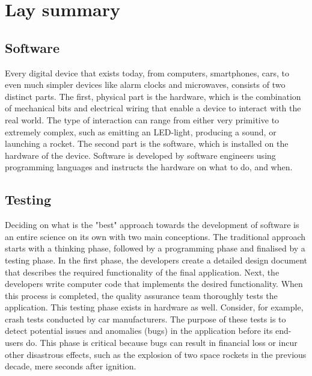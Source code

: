 
\chapter*{Lay summary}

\section*{Software}
Every digital device that exists today, from computers, smartphones, cars, to even much simpler devices like alarm clocks and microwaves, consists of two distinct parts. The first, physical part is the hardware, which is the combination of mechanical bits and electrical wiring that enable a device to interact with the real world. The type of interaction can range from either very primitive to extremely complex, such as emitting an LED-light, producing a sound, or launching a rocket. The second part is the software, which is installed on the hardware of the device. Software is developed by software engineers using programming languages and instructs the hardware on what to do, and when.

\section*{Testing}
Deciding on what is the "best" approach towards the development of software is an entire science on its own with two main conceptions. The traditional approach starts with a thinking phase, followed by a programming phase and finalised by a testing phase. In the first phase, the developers create a detailed design document that describes the required functionality of the final application. Next, the developers write computer code that implements the desired functionality. When this process is completed, the quality assurance team thoroughly tests the application. This testing phase exists in hardware as well. Consider, for example, crash tests conducted by car manufacturers. The purpose of these tests is to detect potential issues and anomalies (bugs) in the application before its end-users do. This phase is critical because bugs can result in financial loss or incur other disastrous effects, such as the explosion of two space rockets in the previous decade, mere seconds after ignition.


